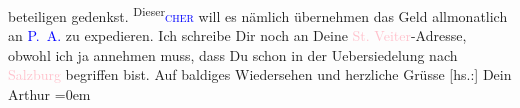                beteiligen ge{\pb}denkst. \substVorne{}\textsuperscript{Dieser}{\allowbreak}\substDazwischen{}\textcolor{blue}{\textsc{cher}}{}\ledrightnote{\textcolor{blue}{Samuel Fischer}}\substHinten{} will es nämlich übernehmen das Geld allmonatlich an \textcolor{blue}{P. A.}{}\ledrightnote{\textcolor{blue}{Peter Altenberg}} zu expedieren.\pend
           \pstart
           Ich schreibe Dir noch an Deine \textcolor{pink}{St. Veiter}{}\ledrightnote{\textcolor{pink}{Sankt Veit}}-Adresse,
               obwohl ich ja annehmen muss, dass Du schon in der Uebersiedelung nach \textcolor{pink}{Salzburg}{}\ledrightnote{\textcolor{pink}{Salzburg}} begriffen bist.\pend
           \pstart
           Auf baldiges Wiedersehen und herzliche Grüsse\pend
           \pstart
           {[}hs.:{]} Dein{\\[\baselineskip]}\spacefill\mbox{Arthur}\pend
           \leftskip=0em{}\endnumbering{}  
      